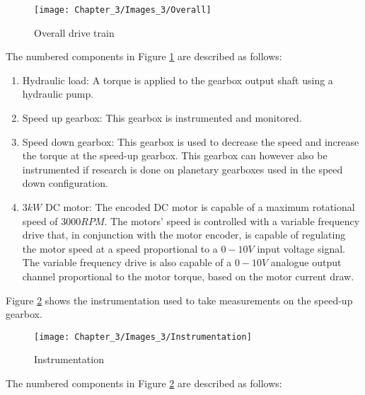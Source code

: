 \begin{figure}[H]
	\centering
	\texttt{[image: Chapter\_3/Images\_3/Overall]}
	\caption{Overall drive train}
	\label{F:Overall}
\end{figure}

The numbered components in Figure \ref{F:Overall} are described as follows:

\begin{enumerate}
	\item Hydraulic load: A torque is applied to the gearbox output shaft using a hydraulic pump.
	\item Speed up gearbox: This gearbox is instrumented and monitored.
	\item Speed down gearbox: This gearbox is used to decrease the speed and increase the torque at the speed-up gearbox. This gearbox can however also be instrumented if research is done on planetary gearboxes used in the speed down configuration.
	\item $3kW$ DC motor: The encoded DC motor is capable of a maximum rotational speed of $3000RPM$. The motors' speed is controlled with a variable frequency drive that, in conjunction with the motor encoder, is capable of regulating the motor speed at a speed proportional to a $0-10V$ input voltage signal. The variable frequency drive is also capable of a $0-10V$ analogue output channel proportional to the motor torque, based on the motor current draw.
\end{enumerate}


Figure \ref{F:Instrumentation} shows the instrumentation used to take measurements on the speed-up gearbox.

\begin{figure}[H]
	\centering
	\texttt{[image: Chapter\_3/Images\_3/Instrumentation]}
	\caption{Instrumentation}
	\label{F:Instrumentation}
\end{figure}

The numbered components in Figure \ref{F:Instrumentation} are described as follows:

